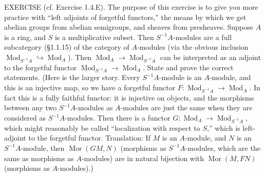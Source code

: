 EXERCISE (cf. Exercise 1.4.E). The purpose of this exercise is to give you more practice with “left adjoints of forgetful functors,” the means by which we get abelian groups from abelian semigroups, and sheaves from presheaves. Suppose $A$ is a ring, and $S$ is a multiplicative subset. Then $S^{-1}A$-modules are a full subcategory (§1.1.15) of the category of $A$-modules (via the obvious inclusion $\operatorname{Mod}_{S^{-1}A}\hookrightarrow\operatorname{Mod}_A$). Then $\operatorname{Mod}_A\to\operatorname{Mod}_{S^{-1}A}$ can be interpreted as an adjoint to the forgetful functor $\operatorname{Mod}_{S^{-1}A}\to\operatorname{Mod}_A$. State and prove the correct statements. (Here is the larger story. Every $S^{-1}A$-module is an $A$-module, and this is an injective map, so we have a forgetful functor $F:\operatorname{Mod}_{S^{-1}A}\to\operatorname{Mod}_A$. In fact this is a fully faithful functor: it is injective on objects, and the morphisms between any two $S^{-1}A$-modules as $A$-modules are just the same when they are considered as $S^{-1}A$-modules. Then there is a functor $G:\operatorname{Mod}_A\to\operatorname{Mod}_{S^{-1}A}$, which might reasonably be called “localization with respect to $S$,” which is left-adjoint to the forgetful functor. Translation: If $M$ is an $A$-module, and $N$ is an $S^{-1}A$-module, then $\operatorname{Mor}(GM,N)$ (morphisms as $S^{-1}A$-modules, which are the same as morphisms as $A$-modules) are in natural bijection with $\operatorname{Mor}(M,FN)$ (morphisms as $A$-modules).)

